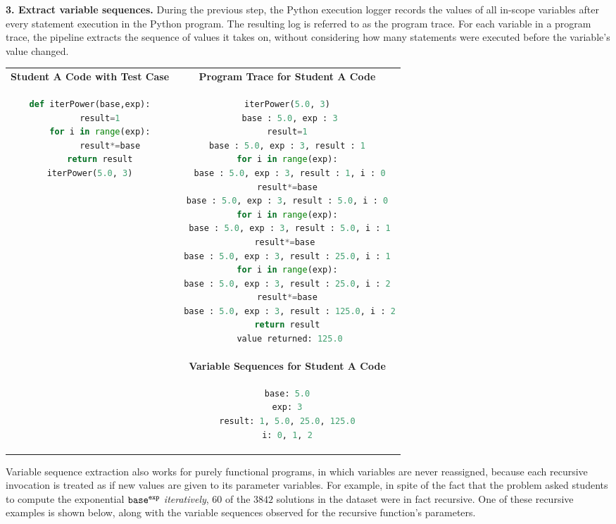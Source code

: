 {\bf 3. Extract variable sequences.} During the previous step, the Python execution logger \cite{pgbovineOPT} records the values of all in-scope variables after every statement execution in the Python program. The resulting log is referred to as the program trace. For each variable in a program trace, the pipeline extracts the sequence of values it takes on, without considering how many statements were executed before the variable's value changed.
\\
\begin{tabular}{cc}
{\bf Student A Code with Test Case} & {\bf Program Trace for Student A Code} \\
\begin{minipage}{0.35\linewidth}
\begin{lstlisting}[language=python]
def iterPower(base,exp):
    result=1
    for i in range(exp):
        result*=base
    return result
iterPower(5.0, 3)
\end{lstlisting}
\end{minipage} &
\begin{minipage}{0.6\linewidth}
\begin{lstlisting}[language=python,linebackgroundcolor={\lstcolorlines[lightyellow]{2,4,6,8,10,12,14,16,18}}]
iterPower(5.0, 3)
 base : 5.0, exp : 3
result=1
 base : 5.0, exp : 3, result : 1 
for i in range(exp):
 base : 5.0, exp : 3, result : 1, i : 0
result*=base
 base : 5.0, exp : 3, result : 5.0, i : 0 
for i in range(exp):
 base : 5.0, exp : 3, result : 5.0, i : 1
result*=base 
 base : 5.0, exp : 3, result : 25.0, i : 1 
for i in range(exp):
 base : 5.0, exp : 3, result : 25.0, i : 2 
result*=base
 base : 5.0, exp : 3, result : 125.0, i : 2
return result
 value returned: 125.0
\end{lstlisting}
\end{minipage} 
\\
& {\bf Variable Sequences for Student A Code} \\
&
\begin{minipage}{0.6\linewidth}
\begin{lstlisting}[language=python]
base: 5.0
exp: 3
result: 1, 5.0, 25.0, 125.0
i: 0, 1, 2
\end{lstlisting}
\end{minipage} \\
\end{tabular}

Variable sequence extraction also works for purely functional programs, in which variables are never reassigned, because each recursive invocation is treated as if new values are given to its parameter variables. For example, in spite of the fact that the  problem asked students to compute the exponential $\texttt{base}^{\texttt{exp}}$ \textit{iteratively}, $60$ of the $3842$  solutions in the dataset were in fact recursive. One of these recursive examples is shown below, along with the variable sequences observed for the recursive function's parameters.

